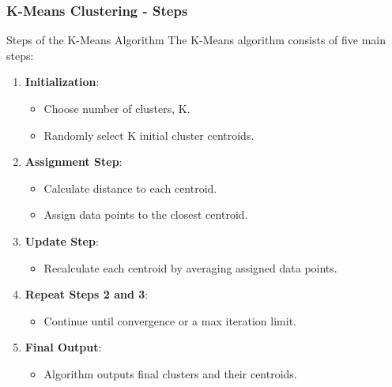 \documentclass[aspectratio=169]{beamer}
\begin{document}
\begin{frame}[fragile]
    \frametitle{K-Means Clustering - Steps}
    \begin{block}{Steps of the K-Means Algorithm}
        The K-Means algorithm consists of five main steps:
        \begin{enumerate}
            \item \textbf{Initialization}:
                \begin{itemize}
                    \item Choose number of clusters, K.
                    \item Randomly select K initial cluster centroids.
                \end{itemize}
            \item \textbf{Assignment Step}:
                \begin{itemize}
                    \item Calculate distance to each centroid.
                    \item Assign data points to the closest centroid.
                \end{itemize}
            \item \textbf{Update Step}:
                \begin{itemize}
                    \item Recalculate each centroid by averaging assigned data points.
                \end{itemize}
            \item \textbf{Repeat Steps 2 and 3}:
                \begin{itemize}
                    \item Continue until convergence or a max iteration limit.
                \end{itemize}
            \item \textbf{Final Output}:
                \begin{itemize}
                    \item Algorithm outputs final clusters and their centroids.
                \end{itemize}
        \end{enumerate}
    \end{block}
\end{frame}
\end{document}
